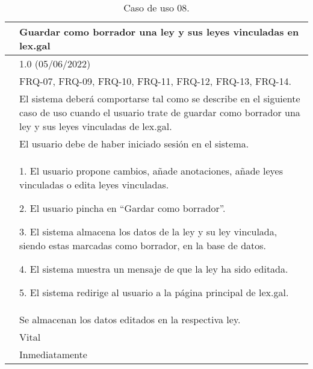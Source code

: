 \begin{table}[H]
\begin{center}
\begin{tabular}{|p{3cm}|p{10cm}|} \hline
\centering {\bf UC-08} & Guardar como borrador una ley y sus leyes vinculadas en lex.gal  \\ \hline\hline
\centering {\bf Versión} & 1.0 (05/06/2022) \\ \hline
\centering {\bf Dependencias} & FRQ-07, FRQ-09, FRQ-10, FRQ-11, FRQ-12, FRQ-13, FRQ-14. \\ \hline
\centering {\bf Descripción} &  El sistema deberá comportarse tal como se describe en el siguiente caso de uso cuando el usuario trate de guardar como borrador una ley y sus leyes vinculadas de lex.gal. \\ \hline
\centering {\bf Precondición} &  El usuario debe de haber iniciado sesión en el sistema. \\ \hline
\centering {\bf Secuencia normal} &  
1. El usuario propone cambios, añade anotaciones, añade leyes vinculadas o edita leyes vinculadas.

2. El usuario pincha en ``Gardar como borrador''.

3. El sistema almacena los datos de la ley y su ley vinculada, siendo estas marcadas como borrador, en la base de datos.

4. El sistema muestra un mensaje de que la ley ha sido editada.

5. El sistema redirige al usuario a la página principal de lex.gal.
\\ \hline
\centering {\bf Postcondición} &  Se almacenan los datos editados en la respectiva ley. \\ \hline
\centering {\bf Importancia} & Vital \\ \hline
\centering {\bf Urgencia} & Inmediatamente \\ \hline
\end{tabular}
\caption{Caso de uso 08.}
\label{enlaceUC8}
\end{center}
\end{table}

